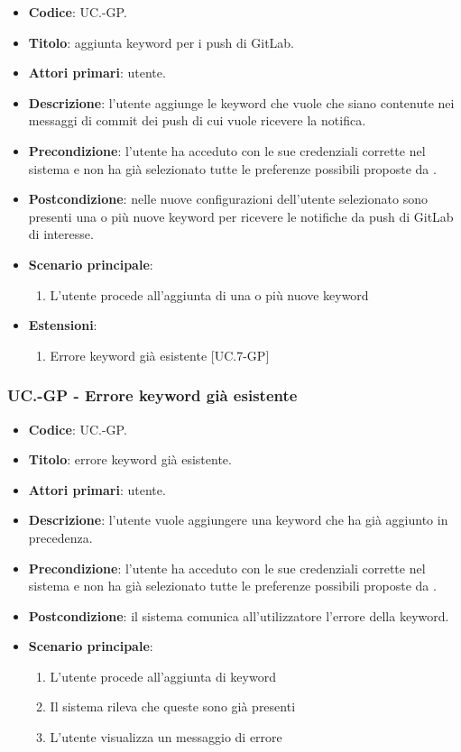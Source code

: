 		\begin{itemize}
			\item \textbf{Codice}: UC\theuccount.\thesubuccount-GP.
			\item \textbf{Titolo}: aggiunta keyword per i push di GitLab.
			\item \textbf{Attori primari}: utente.
			\item \textbf{Descrizione}: l’utente aggiunge le keyword che vuole che siano contenute nei messaggi di commit dei push di cui vuole ricevere la notifica.
			\item \textbf{Precondizione}: l’utente ha acceduto con le sue credenziali corrette nel sistema e non ha già selezionato tutte le preferenze possibili proposte da \progetto.
			\item \textbf{Postcondizione}: nelle nuove configurazioni dell'utente selezionato sono presenti una o più nuove keyword per ricevere le notifiche da push di GitLab di interesse.
			\item \textbf{Scenario principale}:
			\begin{enumerate}
				\item L'utente procede all'aggiunta di una o più nuove keyword
			\end{enumerate}
			\item \textbf{Estensioni}:
			\begin{enumerate}
				\item Errore keyword già esistente [UC\theuccount.7-GP]
			\end{enumerate}
		\end{itemize}

	\subsubsection{UC\theuccount.\thesubuccount-GP - Errore keyword già esistente}

	\begin{itemize}
		\item \textbf{Codice}: UC\theuccount.\thesubuccount-GP.
		\item \textbf{Titolo}: errore keyword già esistente.
		\item \textbf{Attori primari}: utente.
		\item \textbf{Descrizione}: l'utente vuole aggiungere una keyword che ha già aggiunto in precedenza.
		\item \textbf{Precondizione}:  l’utente ha acceduto con le sue credenziali corrette nel sistema e non ha già selezionato tutte le preferenze possibili proposte da \progetto.
		\item \textbf{Postcondizione}: il sistema comunica all’utilizzatore l’errore della keyword.
		\item \textbf{Scenario principale}:
		\begin{enumerate}
			\item L'utente procede all'aggiunta di keyword
			\item Il sistema rileva che queste sono già presenti
			\item L'utente visualizza un messaggio di errore
		\end{enumerate}
	\end{itemize}

